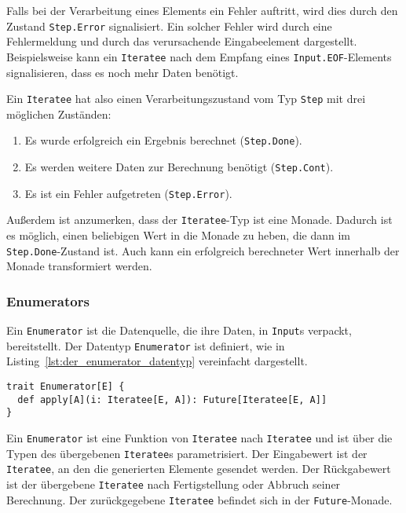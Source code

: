 \documentclass[draft=false
              ,paper=a4
              ,twoside=false
              ,fontsize=11pt
              ,headsepline
              ,BCOR10mm
              ,DIV11
              ]{scrbook}
\begin{document}
Falls bei der Verarbeitung eines Elements ein Fehler auftritt, wird dies durch den Zustand \lstinline|Step.Error| signalisiert.
Ein solcher Fehler wird durch eine Fehlermeldung und durch das verursachende Eingabeelement dargestellt.
Beispielsweise kann ein \lstinline|Iteratee| nach dem Empfang eines \lstinline|Input.EOF|-Elements signalisieren, dass es noch mehr Daten benötigt.

Ein \lstinline|Iteratee| hat also einen Verarbeitungszustand vom Typ \lstinline|Step| mit drei möglichen Zuständen:
\begin{enumerate}
  \item Es wurde erfolgreich ein Ergebnis berechnet (\lstinline|Step.Done|).
  \item Es werden weitere Daten zur Berechnung benötigt (\lstinline|Step.Cont|).
  \item Es ist ein Fehler aufgetreten (\lstinline|Step.Error|).
\end{enumerate}

Außerdem ist anzumerken, dass der \lstinline|Iteratee|-Typ ist eine Monade.
Dadurch ist es möglich, einen beliebigen Wert in die Monade zu heben, die dann im \lstinline|Step.Done|-Zustand ist.
Auch kann ein erfolgreich berechneter Wert innerhalb der Monade transformiert werden.



\subsubsection{Enumerators} %
\label{ssub:design_enumerators}

Ein \lstinline|Enumerator| ist die Datenquelle, die ihre Daten, in \lstinline|Input|s verpackt, bereitstellt.
Der Datentyp \lstinline|Enumerator| ist definiert, wie in Listing~\ref{lst:der_enumerator_datentyp} vereinfacht dargestellt.
\begin{lstlisting}[caption=Der Enumerator-Datentyp, label=lst:der_enumerator_datentyp]
trait Enumerator[E] {
  def apply[A](i: Iteratee[E, A]): Future[Iteratee[E, A]]
}
\end{lstlisting}

Ein \lstinline|Enumerator| ist eine Funktion von \lstinline|Iteratee| nach \lstinline|Iteratee| und ist über die Typen des übergebenen \lstinline|Iteratee|s parametrisiert.
Der Eingabewert ist der \lstinline|Iteratee|, an den die generierten Elemente gesendet werden.
Der Rückgabewert ist der übergebene \lstinline|Iteratee| nach Fertigstellung oder Abbruch seiner Berechnung.
Der zurückgegebene \lstinline|Iteratee| befindet sich in der \lstinline|Future|-Monade.
\end{document}

